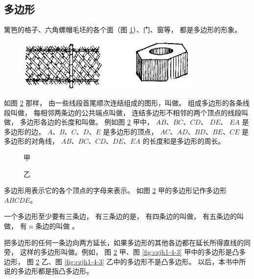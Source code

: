 \subsection{多边形}\label{subsec:czjh1-4-1}

篱笆的格子、六角螺帽毛坯的各个面（图 \ref{fig:czjh1-4-1}）、门、窗等， 都是多边形的形象。

\begin{figure}[htbp]
    \centering
    \includegraphics[width=9cm]{../pic/czjh1-ch4-01.png}
    \caption{}\label{fig:czjh1-4-1}
\end{figure}


如图 \ref{fig:czjh1-4-2} 那样， 由一些线段首尾顺次连结组成的图形，叫做。
组成多边形的各条线段叫做，
每相邻两条边的公共端点叫做，
连结多边形不相邻的两个顶点的线段叫做，
多边形各边的长度和叫做。
例如图 \ref{fig:czjh1-4-2} 甲中， $AB$、$BC$、$CD$、 $DE$、 $EA$ 是多边形的边，
$A$、$B$、$C$、$D$、$E$  是多边形的顶点，
$AC$、$AD$、$BD$、$BE$、$CE$ 是多边形的对角线，
$AB$、$BC$、$CD$、$DE$、$EA$ 的长度和是多边形的周长。

\begin{figure}[htbp]
    \centering
    \begin{minipage}[b]{7cm}
        \centering
        
        \caption*{甲}
    \end{minipage}
    \qquad
    \begin{minipage}[b]{7cm}
        \centering
        
        \caption*{乙}
    \end{minipage}
    \caption{}\label{fig:czjh1-4-2}
\end{figure}


多边形用表示它的各个顶点的字母来表示。
如图 \ref{fig:czjh1-4-2} 甲的多边形记作多边形 $ABCDE$。

一个多边形至少要有三条边，
有三条边的是，
有四条边的叫做，
有五条边的叫做，
有 $n$ 条边的叫做 。

把多边形的任何一条边向两方延长，如果多边形的其他各边都在延长所得直线的同旁，
这样的多边形叫做。例如，
图 \ref{fig:czjh1-4-2} 甲、图 \ref{fig:czjh1-4-3} 甲中的多边形是凸多边形，
图 \ref{fig:czjh1-4-2} 乙、图 \ref{fig:czjh1-4-3} 乙中的多边形不是凸多边形。
以后，本书中所说的多边形都是指凸多边形。

